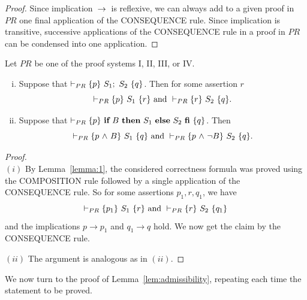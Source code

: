 \documentclass[manuscript, screen, review]{acmart}
\begin{document}
\begin{proof}
Since implication $\mbox{$\:\rightarrow\:$}$ is reflexive, we can always add to a given proof in $\mathit{PR}$
one final application of the CONSEQUENCE rule.
Since implication is transitive, successive applications of the CONSEQUENCE rule in a proof in $\mathit{PR}$
can be condensed into one application.
\HB
\end{proof} 

\begin{lemma} \label{lem:useful}
Let $\mathit{PR}$ be one of the proof systems I, II, III, or IV.
  \begin{enumerate} [(i)] 
  \item  Suppose that  $\vdash_{PR} \HT{p}{S_1; \ S_2}{q}$.
    Then for some assertion $r$
    \[
 \vdash_{PR} \mbox{$\{{p}\}\ {S_1}\ \{{r}\}$} \mbox{ and }
 \vdash_{PR} \mbox{$\{{r}\}\ {S_2}\ \{{q}\}$}.
\]

\item Suppose that  $\vdash_{PR} \mbox{$\{{p}\}\ {\mbox{$\mbox{{\bf if}\ } {B} \mbox{\ {\bf then}\ } {S_1} \mbox{\ {\bf else}\ } {S_2}\ \mbox{{\bf fi}}$}}\ \{{q}\}$}$.
    Then 
    \[
 \vdash_{PR} \mbox{$\{{p \mbox{$\ \wedge\ $} B}\}\ {S_1}\ \{{q}\}$} \mbox{ and }
 \vdash_{PR} \mbox{$\{{p \mbox{$\ \wedge\ $} \neg B}\}\ {S_2}\ \{{q}\}$}.
\]
 \end{enumerate}    
\end{lemma}
\begin{proof}
  \mbox{} \\
  $(i)$ By Lemma~\ref{lemma:1}, the considered correctness formula was proved using
  the COMPOSITION rule followed by a single application of the CONSEQUENCE rule.
  So for some assertions $p_1, r, q_1$, we have
    \[
 \vdash_{PR} \mbox{$\{{p_1}\}\ {S_1}\ \{{r}\}$} \mbox{ and }
 \vdash_{PR} \mbox{$\{{r}\}\ {S_2}\ \{{q_1}\}$}
\]
and the implications $p \to p_1$ and $q_1 \to q$ hold.
We now get the claim by the CONSEQUENCE rule.
\III

\NI
$(ii)$ The argument is analogous as in $(ii)$. 
\HB
\end{proof}



We now turn to the proof of Lemma~\ref{lem:admissibility}, 
repeating each time the statement to be proved.
\end{document}
